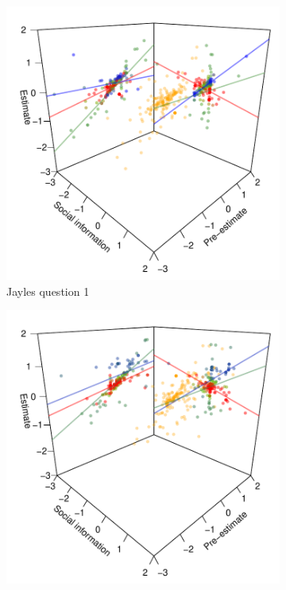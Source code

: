 \documentclass[10pt,a4paper,twocolumn,lineno]{article}
\begin{document}
\begin{figure}[htbp]
	\centering
	\begin{subfigure}[b]{.24\textwidth}
		\includegraphics[width=\textwidth]{../plots/jayles1_vs_xp3d.pdf}
		\caption{Jayles question 1}
	\end{subfigure}
	\begin{subfigure}[b]{.24\textwidth}
		\includegraphics[width=\textwidth]{../plots/jayles2_vs_xp3d.pdf}

\end{subfigure}
\end{figure}
\end{document}
